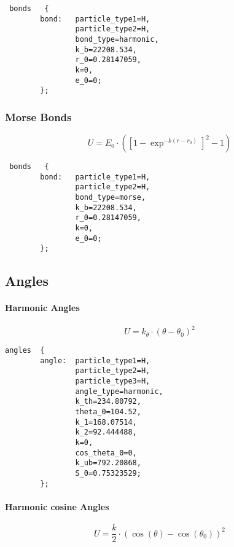 \begin{lstlisting}
 bonds   {
        bond:   particle_type1=H,
                particle_type2=H,
                bond_type=harmonic,
                k_b=22208.534,
                r_0=0.28147059,
                k=0,
                e_0=0;
        };
\end{lstlisting}

\subsubsection{Morse Bonds}
\begin{equation*}
U = E_0 \cdot \left( \left[ 1- \exp^{-k(r-r_0)} \right]^2-1 \right)
\end{equation*}
\begin{lstlisting}
 bonds   {
        bond:   particle_type1=H,
                particle_type2=H,
                bond_type=morse,
                k_b=22208.534,
                r_0=0.28147059,
                k=0,
                e_0=0;
        };
\end{lstlisting}



\subsection{Angles}
\paragraph{Harmonic Angles}
\begin{equation*}
U = k_\theta\cdot(\theta-\theta_0)^2
\end{equation*}

\begin{lstlisting}
angles  {
        angle:  particle_type1=H,
                particle_type2=H,
                particle_type3=H,
                angle_type=harmonic,
                k_th=234.80792,
                theta_0=104.52,
                k_1=168.07514,
                k_2=92.444488,
                k=0,
                cos_theta_0=0,
                k_ub=792.20868,
                S_0=0.75323529;
        };
\end{lstlisting}

\paragraph{Harmonic cosine Angles}
\begin{equation*}
U = \frac{k}{2} \cdot\left( \cos(\theta) -\cos(\theta_0)\right)^2
\end{equation*}
